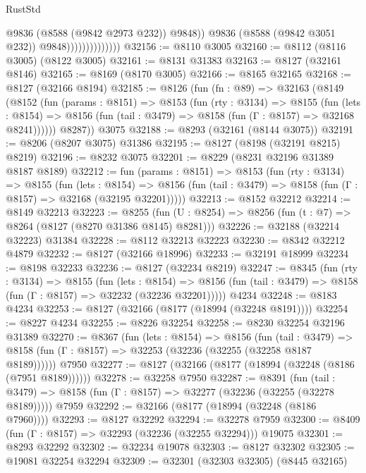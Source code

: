 \begin{lexlean}{RustStd}
\begin{coremodule}
                                    @9836
                                    (@8588 (@9842 @2973 @232))
                                    @9848))
                                @9836
                                (@8588 (@9842 @3051 @232))
                                @9848))))))))))))))
@32156 := @8110 @3005
@32160 := @8112 (@8116 @3005) (@8122 @3005)
@32161 := @8131 @31383
@32163 := @8127 (@32161 @8146)
@32165 := @8169 (@8170 @3005)
@32166 := @8165 @32165
@32168 := @8127 (@32166 @8194)
@32185 := @8126
    (fun (fn : @89) =>
    @32163
      (@8149
        (@8152
          (fun (params : @8151) =>
          @8153
            (fun (rty : @3134) =>
            @8155
              (fun (lets : @8154) =>
              @8156 (fun (tail : @3479) => @8158 (fun (Γ : @8157) => @32168 @8241))))))
        @8287))
    @3075
@32188 := @8293 (@32161 (@8144 @3075))
@32191 := @8206 (@8207 @3075) @31386
@32195 := @8127 (@8198 (@32191 @8215) @8219)
@32196 := @8232 @3075
@32201 := @8229 (@8231 @32196 @31389 @8187 @8189)
@32212 := fun (params : @8151) =>
  @8153
    (fun (rty : @3134) =>
    @8155
      (fun (lets : @8154) =>
      @8156 (fun (tail : @3479) => @8158 (fun (Γ : @8157) => @32168 (@32195 @32201)))))
@32213 := @8152 @32212
@32214 := @8149 @32213
@32223 := @8255
    (fun (U : @8254) => @8256 (fun (t : @7) => @8264 (@8127 (@8270 @31386 @8145) @8281)))
@32226 := @32188 (@32214 @32223) @31384
@32228 := @8112 @32213 @32223
@32230 := @8342 @32212 @4879
@32232 := @8127 (@32166 @18996)
@32233 := @32191 @18999
@32234 := @8198 @32233
@32236 := @8127 (@32234 @8219)
@32247 := @8345
    (fun (rty : @3134) =>
    @8155
      (fun (lets : @8154) =>
      @8156 (fun (tail : @3479) => @8158 (fun (Γ : @8157) => @32232 (@32236 @32201)))))
    @4234
@32248 := @8183 @4234
@32253 := @8127 (@32166 (@8177 (@18994 (@32248 @8191))))
@32254 := @8227 @4234
@32255 := @8226 @32254
@32258 := @8230 @32254 @32196 @31389
@32270 := @8367
    (fun (lets : @8154) =>
    @8156
      (fun (tail : @3479) =>
      @8158 (fun (Γ : @8157) => @32253 (@32236 (@32255 (@32258 @8187 @8189))))))
    @7950
@32277 := @8127 (@32166 (@8177 (@18994 (@32248 (@8186 (@7951 @8189))))))
@32278 := @32258 @7950
@32287 := @8391
    (fun (tail : @3479) => @8158 (fun (Γ : @8157) => @32277 (@32236 (@32255 (@32278 @8189)))))
    @7959
@32292 := @32166 (@8177 (@18994 (@32248 (@8186 @7960))))
@32293 := @8127 @32292
@32294 := @32278 @7959
@32300 := @8409 (fun (Γ : @8157) => @32293 (@32236 (@32255 @32294))) @19075
@32301 := @8293 @32292
@32302 := @32234 @19078
@32303 := @8127 @32302
@32305 := @19081 @32254 @32294
@32309 := @32301 (@32303 @32305) (@8445 @32165)

\end{coremodule}
\end{lexlean}
